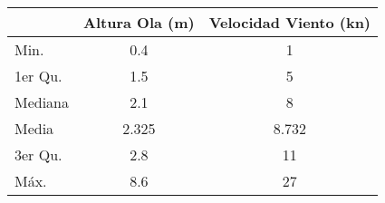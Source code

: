 \begin{tabular}{lS[table-format=1.3]S[table-format=2.3]}
    \toprule
    & {Altura Ola (\si{\meter})} & {Velocidad Viento (\si{\knot})} \\
    \midrule
 Min.   &0.4   &  1\\ 
 1er Qu.&1.5   &  5\\ 
 Mediana &2.1   &  8\\ 
 Media   &2.325   &  8.732   \\ 
 3er Qu.&2.8   & 11\\ 
 Máx.   &8.6   & 27\\ 
    \bottomrule
\end{tabular}
